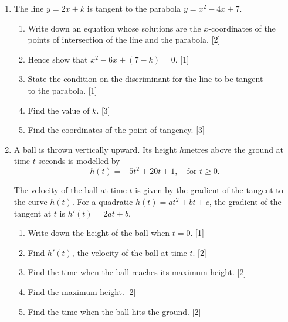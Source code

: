 \documentclass[12pt, twoside]{article}
\begin{document}
\begin{enumerate}[itemsep=0.2cm]
\newpage

\item The line $y = 2x + k$ is tangent to the parabola $y = x^2 - 4x + 7$.

\begin{enumerate}[itemsep=0.15cm]
  \item Write down an equation whose solutions are the $x$-coordinates
        of the points of intersection of the line and the parabola. \hfill [2]
  \item Hence show that $x^2 - 6x + (7 - k) = 0$. \hfill [1]
  \item State the condition on the discriminant for the line to be tangent\\
        to the parabola. \hfill [1]
  \item Find the value of $k$. \hfill [3]
  \item Find the coordinates of the point of tangency. \hfill [3]
\end{enumerate}


\newpage

\item A ball is thrown vertically upward. Its height $h$\;metres above the ground
at time $t$ seconds is modelled by
\[h(t) = -5t^2 + 20t + 1, \quad \text{for } t \geq 0.\]

The velocity of the ball at time $t$ is given by the gradient of the
tangent to the curve $h(t)$. For a quadratic $h(t) = at^2 + bt + c$,
the gradient of the tangent at $t$ is $h'(t) = 2at + b$.

\begin{enumerate}[itemsep=0.15cm]
  \item Write down the height of the ball when $t = 0$. \hfill [1]
  \item Find $h'(t)$, the velocity of the ball at time $t$. \hfill [2]
  \item Find the time when the ball reaches its maximum height. \hfill [2]
  \item Find the maximum height. \hfill [2]
  \item Find the time when the ball hits the ground. \hfill [2]
\end{enumerate}


\end{enumerate}
\end{document}
